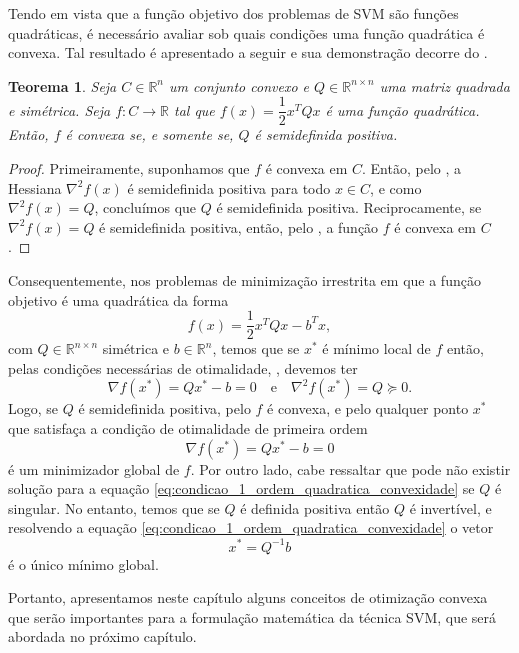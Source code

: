 \documentclass[12pt,a4paper]{scrartcl}
\def\RR{\mathds{R}}
\newtheorem{teo}{Teorema}
\theoremstyle{definition}%
\begin{document}
Tendo em vista que a função objetivo dos problemas de SVM são funções quadráticas, é necessário avaliar sob quais condições uma função quadrática é convexa. Tal resultado é apresentado a seguir e sua demonstração decorre do .

\begin{teo} \label{teo:funcao_quadratica_e_convexa}
Seja $C \in \RR^{n}$ um conjunto convexo e $Q \in \RR^{n\times n}$ uma matriz quadrada e simétrica. Seja $f:C \rightarrow \RR$ tal que $f(x) = \dfrac{1}{2}x^{T}Qx$ é uma função quadrática. Então, $f$ é convexa se, e somente se, $Q$ é semidefinida positiva.
\end{teo}
\begin{proof}
Primeiramente, suponhamos que $f$ é convexa em $C$. Então, pelo , a Hessiana $\nabla^{2} f(x)$ é semidefinida positiva para todo $x\in C$, e como $\nabla^{2} f(x) = Q$, concluímos que $Q$ é semidefinida positiva. Reciprocamente, se $\nabla^{2} f(x) = Q$ é semidefinida positiva, então, pelo , a função $f$ é convexa em $C$.
\end{proof}

Consequentemente, nos problemas de minimização irrestrita em que a função objetivo é uma quadrática da forma
\[
f(x) = \dfrac{1}{2}x^{T}Qx - b^{T}x,
\]
com $Q\in \RR^{n\times n}$ simétrica e $b\in \RR^{n}$, 
temos que se $x^{*}$ é mínimo local de $f$ então, pelas condições necessárias de otimalidade, , devemos ter
\[
\nabla f(x^{*})= Qx^{*}-b =0 \quad \text{e} \quad \nabla^{2} f(x^{*})=Q \succcurlyeq 0.
\]
Logo, se $Q$ é semidefinida positiva, pelo  $f$ é convexa, e pelo  qualquer ponto $x^{*}$ que satisfaça a condição de otimalidade de primeira ordem 
\[ \label{eq:condicao_1_ordem_quadratica_convexidade}
\nabla f(x^{*})= Qx^{*}-b =0
\] 
é um minimizador global de $f$. Por outro lado, cabe ressaltar que pode não existir solução para a equação \eqref{eq:condicao_1_ordem_quadratica_convexidade} se $Q$ é singular. No entanto, temos que se $Q$ é definida positiva então $Q$ é invertível, e resolvendo a equação \eqref{eq:condicao_1_ordem_quadratica_convexidade} o vetor
\[
x^{*} = Q^{-1}b
\]  
é o único mínimo global.

Portanto, apresentamos neste capítulo alguns conceitos de otimização convexa que serão importantes para a formulação matemática da técnica SVM, que será abordada no próximo capítulo.
\end{document}
